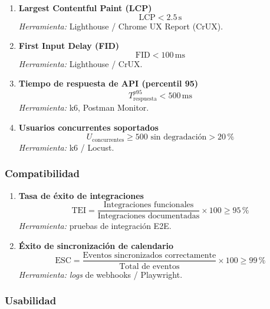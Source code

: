 \documentclass[12pt, a4paper]{article}
\begin{document}
\begin{enumerate}[leftmargin=*, label=\textbf{KPI \arabic*.}, start=4]

    \item \textbf{Largest Contentful Paint (LCP)}
    \[
        \text{LCP} < 2.5\,\text{s}
    \]
    \textit{Herramienta:} Lighthouse / Chrome UX Report (CrUX).

    \item \textbf{First Input Delay (FID)}
    \[
        \text{FID} < 100\,\text{ms}
    \]
    \textit{Herramienta:} Lighthouse / CrUX.

    \item \textbf{Tiempo de respuesta de API (percentil 95)}
    \[
        T_{\text{respuesta}}^{p95} < 500\,\text{ms}
    \]
    \textit{Herramienta:} k6, Postman Monitor.

    \item \textbf{Usuarios concurrentes soportados}
    \[
        U_{\text{concurrentes}} \geq 500 \text{ sin degradación} > 20\,\%
    \]
    \textit{Herramienta:} k6 / Locust.

\end{enumerate}

\subsubsection*{Compatibilidad}

\begin{enumerate}[leftmargin=*, label=\textbf{KPI \arabic*.}, start=8]

    \item \textbf{Tasa de éxito de integraciones}
    \[
        \text{TEI} = \frac{\text{Integraciones funcionales}}{\text{Integraciones documentadas}} \times 100 \geq 95\,\%
    \]
    \textit{Herramienta:} pruebas de integración E2E.

    \item \textbf{Éxito de sincronización de calendario}
    \[
        \text{ESC} = \frac{\text{Eventos sincronizados correctamente}}{\text{Total de eventos}} \times 100 \geq 99\,\%
    \]
    \textit{Herramienta:} \textit{logs} de webhooks / Playwright.

\end{enumerate}

\subsubsection*{Usabilidad}
\end{document}
